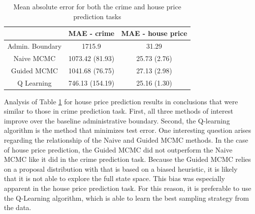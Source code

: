 \begin{center}
\begin{table}[h!]
\begin{tabular}{ |c|c|c| } 
 \hline
  & MAE - crime & MAE - house price   \\
 \hline
 Admin. Boundary & 1715.9 & 31.29 \\
 \hline
 Naive MCMC & 1073.42 (81.93) & 25.73 (2.76)  \\ 
 \hline
 Guided MCMC & 1041.68 (76.75) & 27.13 (2.98)  \\ 
 \hline
 Q Learning & 746.13 (154.19) & 25.16 (1.30) \\  
 \hline
\end{tabular}
\caption{Mean absolute error for both the crime and house price prediction tasks}
\label{table:mae}
\end{table}
\end{center}

\label{HousePrice} Analysis of Table \ref{table:mae} for house price prediction results in conclusions that were similar to those in crime prediction task. First, all three methods of interest improve over the baseline administrative boundary. Second, the Q-learning algorithm is the method that minimizes test error. One interesting question arises regarding the relationship of the Naive and Guided MCMC methods. In the case of house price prediction, the Guided MCMC did not outperform the Naive MCMC like it did in the crime prediction task. Because the Guided MCMC relies on a proposal distribution with that is based on a biased heuristic, it is likely that it is not able to explore the full state space. This bias was especially apparent in the house price prediction task. For this reason, it is preferable to use the Q-Learning algorithm, which is able to learn the best sampling strategy from the data.

